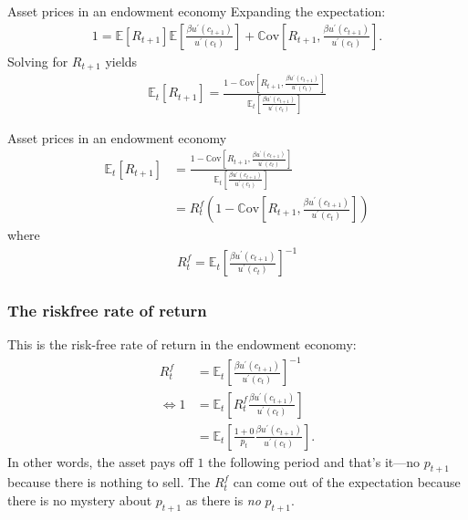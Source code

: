 \documentclass[presentation]{beamer}
\begin{document}
\begin{frame}[label=sec-4-3]{Asset prices in an endowment economy}
Expanding the expectation: 
\begin{align*}
1 = \mathbb{E} \left[ R_{t+1} \right] \mathbb{E} \left[ \frac{\beta u^{\prime}(c_{t+1})}{u^{\prime}(c_{t})} \right] + \mathbb{C} \text{ov} \left[ R_{t+1}, \frac{\beta u^{\prime}(c_{t+1})}{u^{\prime}(c_{t})} \right].
\end{align*}
Solving for $R_{t+1}$ yields
\begin{align*}
\mathbb{E}_{t} \left[ R_{t+1} \right] = \frac{1 - \mathbb{C} \text{ov} \left[ R_{t+1}, \frac{\beta u^{\prime}(c_{t+1})}{u^{\prime}(c_{t})} \right]}{ \mathbb{E}_{t} \left[ \frac{\beta u^{\prime}(c_{t+1})}{u^{\prime}(c_{t})} \right]}
\end{align*}
\end{frame}
\begin{frame}[label=sec-4-4]{Asset prices in an endowment economy}
\begin{align*}
\mathbb{E}_{t} \left[ R_{t+1} \right] &= \frac{1 - \mathbb{C} \text{ov} \left[ R_{t+1}, \frac{\beta u^{\prime}(c_{t+1})}{u^{\prime}(c_{t})} \right]}{ \mathbb{E}_{t} \left[ \frac{\beta u^{\prime}(c_{t+1})}{u^{\prime}(c_{t})} \right]} \\
&= R^{f}_{t} \left( 1 - \mathbb{C} \text{ov} \left[ R_{t+1}, \frac{\beta u^{\prime}(c_{t+1})}{u^{\prime}(c_{t})} \right] \right)
\end{align*}
where
\begin{align*}
R^{f}_{t} = \mathbb{E}_{t} \left[ \frac{\beta u^{\prime}(c_{t+1})}{u^{\prime}(c_{t})} \right]^{-1} 
\end{align*}
\end{frame}

\begin{frame}
\frametitle{The riskfree rate of return}
This is the risk-free rate of return in the endowment economy:
\begin{align*}
R^{f}_{t} &= \mathbb{E}_{t} \left[ \frac{\beta u^{\prime}(c_{t+1})}{u^{\prime}(c_{t})} \right]^{-1} \\
\iff 1 &= \mathbb{E}_{t} \left[ R^{f}_{t} \frac{\beta u^{\prime}(c_{t+1})}{u^{\prime}(c_{t})} \right] \\
&= \mathbb{E}_{t} \left[ \frac{1 + 0}{p_{t}} \frac{\beta u^{\prime}(c_{t+1})}{u^{\prime}(c_{t})} \right].
\end{align*}
In other words, the asset pays off $1$ the following period and that's it---no $p_{t+1}$ because there is nothing to sell.
The $R^{f}_{t}$ can come out of the expectation because there is no mystery about $p_{t+1}$ as there is \emph{no} $p_{t+1}$.
\end{frame}
\end{document}
